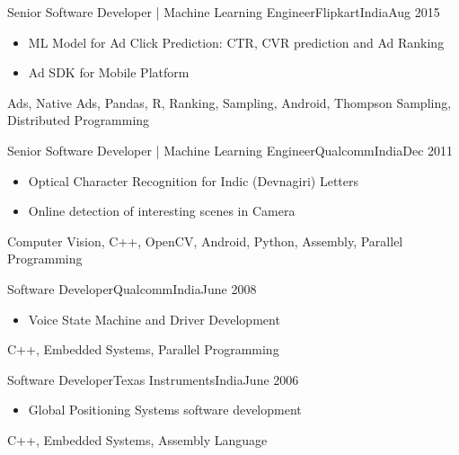 \begin{experiences}
   {Senior Software Developer | Machine Learning Engineer}{Flipkart}{India}{Aug 2015}    
  {
  	\begin{itemize}
  		
  		\item ML Model for Ad Click Prediction: CTR, CVR prediction and Ad Ranking
  		
  		\item Ad SDK for Mobile Platform
  	\end{itemize}
  }
{ Ads, Native Ads, Pandas, R, Ranking, Sampling, Android, Thompson Sampling, Distributed Programming}
\emptySeparator

   {Senior Software Developer | Machine Learning Engineer}{Qualcomm}{India}{Dec 2011}    
  {
	\begin{itemize}
		\item Optical Character Recognition for Indic (Devnagiri) Letters
		\item Online detection of interesting scenes in Camera
	\end{itemize}
  }
  { Computer Vision, C++, OpenCV, Android, Python, Assembly, Parallel Programming}
  
  \emptySeparator
 
   {Software Developer}{Qualcomm}{India}{June 2008}    
	{
		\begin{itemize}
			\item Voice State Machine and Driver Development
		\end{itemize}
	}
	{ C++, Embedded Systems, Parallel Programming}

  \emptySeparator  
   {Software Developer}{Texas Instruments}{India}{June 2006}    
	{
		\begin{itemize}
			\item Global Positioning Systems software development
		\end{itemize}
	}
	{ C++, Embedded Systems, Assembly Language}  	
	  
\emptySeparator
  
\end{experiences}
